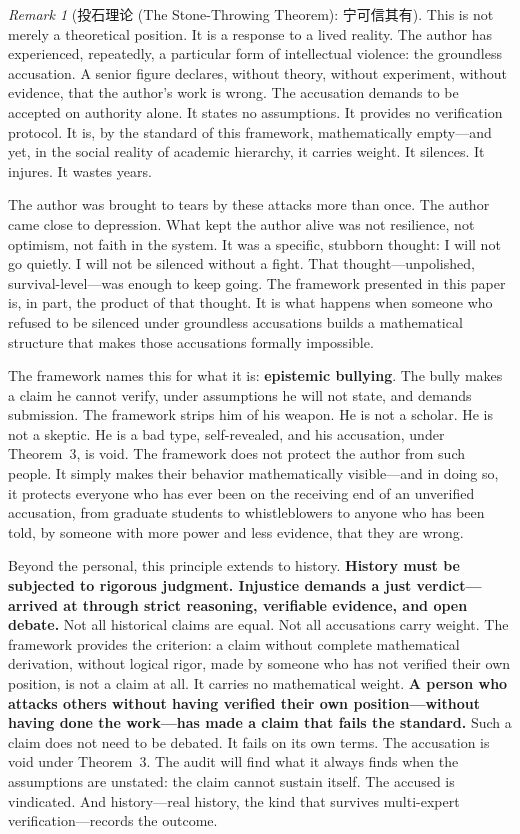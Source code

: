 \documentclass[12pt,a4paper]{ctexart}
\theoremstyle{definition}
\theoremstyle{remark}
\newtheorem{remark}{Remark}[section]
\begin{document}
\begin{remark}[投石理论 (The Stone-Throwing Theorem): 宁可信其有]
This is not merely a theoretical position. It is a response to a lived reality. The author has experienced, repeatedly, a particular form of intellectual violence: the groundless accusation. A senior figure declares, without theory, without experiment, without evidence, that the author's work is wrong. The accusation demands to be accepted on authority alone. It states no assumptions. It provides no verification protocol. It is, by the standard of this framework, mathematically empty—and yet, in the social reality of academic hierarchy, it carries weight. It silences. It injures. It wastes years.

The author was brought to tears by these attacks more than once. The author came close to depression. What kept the author alive was not resilience, not optimism, not faith in the system. It was a specific, stubborn thought: I will not go quietly. I will not be silenced without a fight. That thought—unpolished, survival-level—was enough to keep going. The framework presented in this paper is, in part, the product of that thought. It is what happens when someone who refused to be silenced under groundless accusations builds a mathematical structure that makes those accusations formally impossible.

The framework names this for what it is: \textbf{epistemic bullying}. The bully makes a claim he cannot verify, under assumptions he will not state, and demands submission. The framework strips him of his weapon. He is not a scholar. He is not a skeptic. He is a bad type, self-revealed, and his accusation, under Theorem~3, is void. The framework does not protect the author from such people. It simply makes their behavior mathematically visible—and in doing so, it protects everyone who has ever been on the receiving end of an unverified accusation, from graduate students to whistleblowers to anyone who has been told, by someone with more power and less evidence, that they are wrong.

Beyond the personal, this principle extends to history. \textbf{History must be subjected to rigorous judgment. Injustice demands a just verdict—arrived at through strict reasoning, verifiable evidence, and open debate.} Not all historical claims are equal. Not all accusations carry weight. The framework provides the criterion: a claim without complete mathematical derivation, without logical rigor, made by someone who has not verified their own position, is not a claim at all. It carries no mathematical weight. \textbf{A person who attacks others without having verified their own position—without having done the work—has made a claim that fails the standard.} Such a claim does not need to be debated. It fails on its own terms. The accusation is void under Theorem~3. The audit will find what it always finds when the assumptions are unstated: the claim cannot sustain itself. The accused is vindicated. And history—real history, the kind that survives multi-expert verification—records the outcome.


\end{remark}
\end{document}
